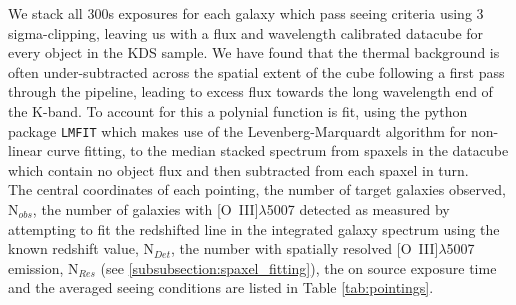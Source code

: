 \documentclass[fleqn,usenatbib]{mn2e}
\begin{document}
We stack all 300s exposures for each galaxy which pass seeing criteria using 3 sigma-clipping, leaving us with a flux and wavelength calibrated datacube for every object in the KDS sample.
We have found that the thermal background is often under-subtracted across the spatial extent of the cube following a first pass through the pipeline, leading to excess flux towards the long wavelength end of the K-band.
To account for this a polynial function is fit, using the python package {\tt LMFIT} \citep{Newville2014} which makes use of the Levenberg-Marquardt algorithm for non-linear curve fitting, to the median stacked spectrum from spaxels in the datacube which contain no object flux and then subtracted from each spaxel in turn. \\

The central coordinates of each pointing, the number of target galaxies observed, N$_{obs}$, the number of galaxies with [O~{\sc III}]$\lambda$5007 detected as measured by attempting to fit the redshifted line in the integrated galaxy spectrum using the known redshift value, N$_{Det}$, the number with spatially resolved [O~{\sc III}]$\lambda$5007 emission, N$_{Res}$ (see \cref{subsubsection:spaxel_fitting}), the on source exposure time and the averaged seeing conditions are listed in Table \ref{tab:pointings}.
\end{document}
